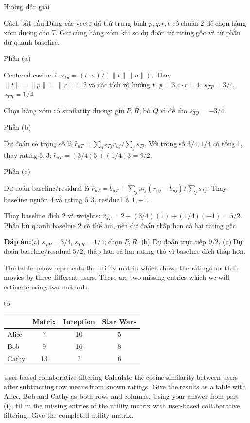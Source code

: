 \documentclass[10pt,a4paper,twocolumn]{article}
\makeatletter
\newcommand{\maptag}[1]{\phantomsection\@bsphack\protected@write\@auxout{}{\string\newlabel{#1}{{}{\thepage}{}{\@currentHref}{}}}\@esphack}
\newcommand{\key}[1]{#1:\enspace}
\newcommand{\solutionprompt}[1]{\par\addvspace{1pt}\noindent\key{Cách bắt đầu}#1\par\addvspace{2pt}}
\newcommand{\blocklabel}[1]{\par\noindent#1\par\nobreak}
\newcommand{\answer}[1]{%
  \par\addvspace{3pt}%
  \blocklabel{#1Hướng dẫn giải}}
\newcommand{\finalanswer}[1]{%
  \par\addvspace{3pt}\noindent\textbf{Đáp án:}\nobreak\enspace#1\par}
\newcommand{\guidepart}[1]{%
  \par\addvspace{1.5pt}%
  \blocklabel{Phần #1}}
\newenvironment{examtable}[1]{%
  \par\addvspace{2pt}\noindent\hbox to \linewidth\bgroup\hfil
  \setlength{\tabcolsep}{4pt}%
  \renewcommand{\arraystretch}{1.12}\begin{tabular}{#1}%
}{\end{tabular}\hfil\egroup\par\addvspace{2pt}}
\newcommand{\qrating}{%
  \begin{examtable}{@{}lccc@{}}
  \toprule
  & Matrix & Inception & Star Wars\\
  \midrule
  Alice & ? & 10 & 5\\
  Bob & 9 & 16 & 8\\
  Cathy & 13 & ? & 6\\
  \bottomrule
  \end{examtable}}
\makeatother
\begin{document}
\answer{\maptag{answer:Pr14}}
\solutionprompt{Dùng các vectơ đã trừ trung bình $p,q,r,t$ có chuẩn 2 để chọn hàng xóm dương cho $T$. Giữ cùng hàng xóm khi so dự đoán từ rating gốc và từ phần dư quanh baseline.}
\guidepart{(a)}
\begin{guidesteps}
\item Centered cosine là $s_{Tu}=(t\cdot u)/(\|t\|\|u\|)$. Thay $\|t\|=\|p\|=\|r\|=2$ và các tích vô hướng $t\cdot p=3,t\cdot r=1$: $s_{TP}=3/4$, $s_{TR}=1/4$.
\item Chọn hàng xóm có similarity dương: giữ $P,R$; bỏ $Q$ vì đề cho $s_{TQ}=-3/4$.
\end{guidesteps}
\guidepart{(b)}
\begin{guidesteps}
\item Dự đoán có trọng số là $\hat r_{uT}=\sum_js_{Tj}r_{uj}/\sum_js_{Tj}$. Với trọng số $3/4,1/4$ có tổng 1, thay rating $5,3$: $\hat r_{uT}=(3/4)5+(1/4)3=9/2$.
\end{guidesteps}
\guidepart{(c)}
\begin{guidesteps}
\item Dự đoán baseline/residual là $\hat r_{uT}=b_{uT}+\sum_js_{Tj}(r_{uj}-b_{uj})/\sum_js_{Tj}$. Thay baseline nguồn 4 và rating $5,3$, residual là $1,-1$.
\item Thay baseline đích 2 và weights: $\hat r_{uT}=2+(3/4)(1)+(1/4)(-1)=5/2$. Phần bù quanh baseline 2 có thể âm, nên dự đoán thấp hơn cả hai rating gốc.
\end{guidesteps}
\finalanswer{(a) $s_{TP}=3/4$, $s_{TR}=1/4$; chọn $P,R$. (b) Dự đoán trực tiếp $9/2$. (c) Dự đoán baseline/residual $5/2$, thấp hơn cả hai rating thô vì baseline đích thấp hơn.}

The table below represents the utility matrix which shows the ratings for three movies by three different users. There are two missing entries which we will estimate using two methods.
\qrating
{} User-based collaborative filtering
 Calculate the cosine-similarity between users after subtracting row means from known ratings. Give the results as a table with Alice, Bob and Cathy as both rows and columns.
 Using your answer from part (i), fill in the missing entries of the utility matrix with user-based collaborative filtering. Give the completed utility matrix.
\end{document}
